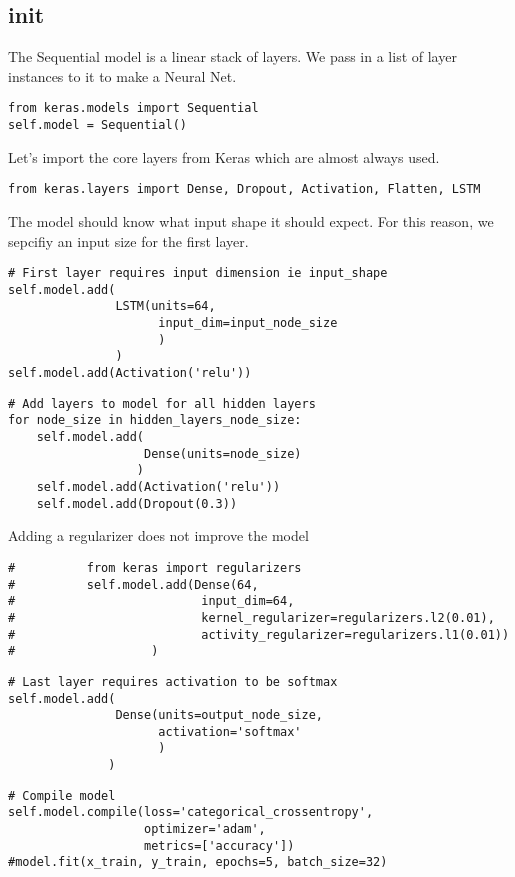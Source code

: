 \documentclass[11pt]{article}
\begin{document}
\subsection{init}
\label{sec:org43c54a9}
The Sequential model is a linear stack of layers. We pass in a list of layer instances to it to make a Neural Net.
\begin{verbatim}
from keras.models import Sequential
self.model = Sequential()
\end{verbatim}

Let's import the core layers from Keras which are almost always used.
\begin{verbatim}
from keras.layers import Dense, Dropout, Activation, Flatten, LSTM
\end{verbatim}

The model should know what input shape it should expect. For this reason, we sepcifiy an input size for the first layer.
\begin{verbatim}
# First layer requires input dimension ie input_shape
self.model.add(
               LSTM(units=64,
                     input_dim=input_node_size
                     )
               )
self.model.add(Activation('relu'))
\end{verbatim}

\begin{verbatim}
# Add layers to model for all hidden layers
for node_size in hidden_layers_node_size:
    self.model.add(
                   Dense(units=node_size)
                  )
    self.model.add(Activation('relu'))
    self.model.add(Dropout(0.3))
\end{verbatim}

Adding a regularizer does not improve the model
\begin{verbatim}
#          from keras import regularizers
#          self.model.add(Dense(64,
#                          input_dim=64,
#                          kernel_regularizer=regularizers.l2(0.01),
#                          activity_regularizer=regularizers.l1(0.01))
#                   )
\end{verbatim}

\begin{verbatim}
# Last layer requires activation to be softmax
self.model.add(
               Dense(units=output_node_size,
                     activation='softmax'
                     )
              )
\end{verbatim}


\begin{verbatim}
# Compile model
self.model.compile(loss='categorical_crossentropy',
                   optimizer='adam',
                   metrics=['accuracy'])
#model.fit(x_train, y_train, epochs=5, batch_size=32)
\end{verbatim}
\end{document}
